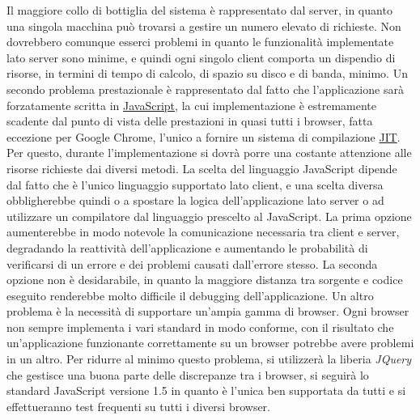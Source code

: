 Il maggiore collo di bottiglia del sistema \`e rappresentato dal server, in quanto una singola macchina pu\`o trovarsi a gestire un numero elevato di richieste. Non dovrebbero comunque esserci problemi in quanto le funzionalit\`a implementate lato server sono minime, e quindi ogni singolo client comporta un dispendio di risorse, in termini di tempo di calcolo, di spazio su disco e di banda, minimo. 
Un secondo problema prestazionale \`e rappresentato dal fatto che l'applicazione sar\`a forzatamente scritta in \underline{JavaScript}, la cui implementazione \`e estremamente scadente dal punto di vista delle prestazioni in quasi tutti i browser, fatta eccezione per Google Chrome, l'unico a fornire un sistema di compilazione \underline{JIT}. Per questo, durante l'implementazione si dovr\`a porre una costante attenzione alle risorse richieste dai diversi metodi. La scelta del linguaggio JavaScript dipende dal fatto che \`e l'unico linguaggio supportato lato client, e una scelta diversa obbligherebbe quindi o a spostare la logica dell'applicazione lato server o ad utilizzare un compilatore dal linguaggio prescelto al JavaScript. La prima opzione aumenterebbe in modo notevole la comunicazione necessaria tra client e server, degradando la reattivit\`a dell'applicazione e aumentando le probabilit\`a di verificarsi di un errore e dei problemi causati dall'errore stesso. La seconda opzione non \`e desidarabile, in quanto la maggiore distanza tra sorgente e codice eseguito renderebbe molto difficile il debugging dell'applicazione.
Un altro problema \`e la necessit\`a di supportare un'ampia gamma di browser. Ogni browser non sempre implementa i vari standard in modo conforme, con il risultato che un'applicazione funzionante correttamente su un browser potrebbe avere problemi in un altro. Per ridurre al minimo questo problema, si utilizzer\`a la liberia \textit{JQuery} che gestisce una buona parte delle discrepanze tra i browser, si seguir\`a lo standard JavaScript versione 1.5 in quanto \`e l'unica ben supportata da tutti e si effettueranno test frequenti su tutti i diversi browser.
\newpage
{}
